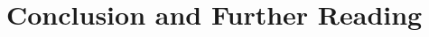 \documentclass[11pt,a4paper,parskip=half-]{scrartcl}
\theoremstyle{definition}
\theoremstyle{plain}
\theoremstyle{remark}
\begin{document}
\section{Conclusion and Further Reading}



\end{document}
